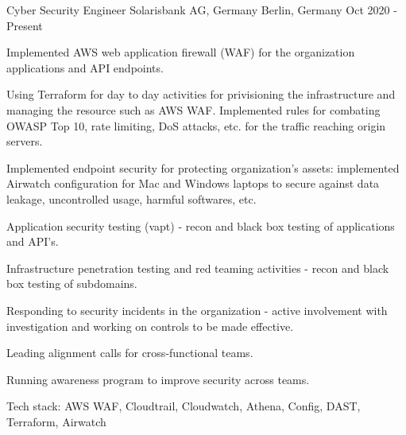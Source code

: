 
\begin{cventries}

\cventry
    {Cyber Security Engineer} %
    {Solarisbank AG, Germany} %
    {Berlin, Germany} %
    {Oct 2020 - Present} %
    {
      \begin{cvitems} %
        \item {Implemented AWS web application firewall (WAF) for the organization applications and API endpoints.
        \item Using Terraform for day to day activities for privisioning the infrastructure and managing the resource such as AWS WAF. Implemented rules for combating OWASP Top 10, rate limiting, DoS attacks, etc. for the traffic reaching origin servers.}
        \item {Implemented endpoint security for protecting organization's assets: implemented Airwatch configuration for Mac and Windows laptops to secure against data leakage, uncontrolled usage, harmful softwares, etc.}
        \item {Application security testing (vapt) - recon and black box testing of applications and API's.}
        \item {Infrastructure penetration testing and red teaming activities  - recon and black box testing of subdomains.}
        \item {Responding to security incidents in the organization - active involvement with investigation and working on controls to be made effective.}
        \item {Leading alignment calls for cross-functional teams.}
        \item {Running awareness program to improve security across teams.}
        \item {Tech stack: AWS WAF, Cloudtrail, Cloudwatch, Athena, Config, DAST, Terraform, Airwatch}
      \end{cvitems}
    }


\end{cventries}
